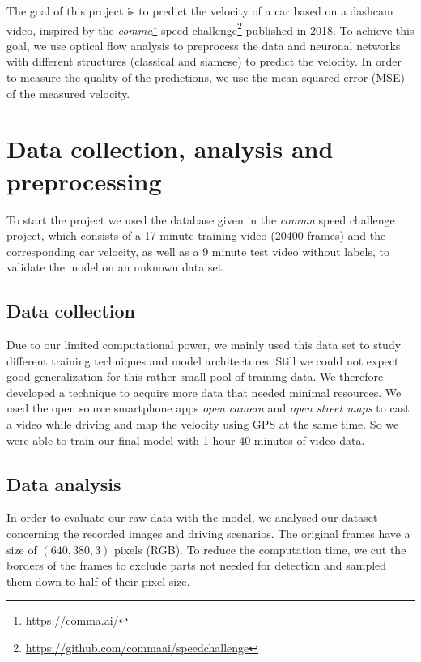 \documentclass[conference]{IEEEtran}
\begin{document}
The goal of this project is to predict the velocity of a car based on a dashcam video, inspired by the \emph{comma}\footnote{\url{https://comma.ai/}} speed challenge\footnote{\url{https://github.com/commaai/speedchallenge}} published in 2018. To achieve this goal, we use optical flow analysis to preprocess the data and neuronal networks with different structures (classical and siamese) to predict the velocity. In order to measure the quality of the predictions, we use the mean squared error (MSE) of the measured velocity.

\section{Data collection, analysis and preprocessing}

To start the project we used the database given in the \emph{comma} speed challenge project, which consists of a 17 minute training video (20400 frames) and the corresponding car velocity, as well as a 9 minute test video without labels, to validate the model on an unknown data set.

\subsection{Data collection}

Due to our limited computational power, we mainly used this data set to study different training techniques and model architectures. Still we could not expect good generalization for this rather small pool of training data. We therefore developed a technique to acquire more data that needed minimal resources. We used the open source smartphone apps \emph{open camera} and \emph{open street maps} to cast a video while driving and map the velocity using GPS at the same time. So we were able to train our final model with 1 hour 40 minutes of video data.

\subsection{Data analysis}
\label{subsec:dataAnalysis}

In order to evaluate our raw data with the model, we analysed our dataset concerning the recorded images and driving scenarios. The original frames have a size of $(640,380,3)$ pixels (RGB). To reduce the computation time, we cut the borders of the frames to exclude parts not needed for detection and sampled them down to half of their pixel size.
\end{document}
